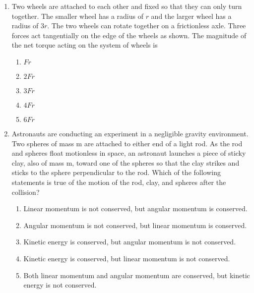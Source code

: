 \documentclass{../../oss-apphys}
\begin{document}
\begin{multicols}{2}
\begin{enumerate}[leftmargin=18pt]
  \item Two wheels are attached to each other and fixed so that they can only
    turn together. The smaller wheel has a radius of $r$ and the larger wheel
    has a radius of $3r$. The two wheels can rotate together on a frictionless
    axle. Three forces act tangentially on the edge of the wheels as shown.
    The magnitude of the net torque acting on the system of wheels is
    \begin{center}
    \end{center}
    \begin{enumerate}[noitemsep,topsep=0pt]
    \item$Fr$
    \item$2Fr$
    \item$3Fr$
    \item$4Fr$
    \item$6Fr$
    \end{enumerate}
    \columnbreak
    
  \item Astronauts are conducting an experiment in a negligible gravity
    environment. Two spheres of mass m are attached to either end of a
    light rod. As the rod and spheres float motionless in space, an astronaut
    launches a piece of sticky clay, also of mass m, toward one of the
    spheres so that the clay strikes and sticks to the sphere perpendicular to
    the rod. Which of the following statements is true of the motion of the
    rod, clay, and spheres after the collision?
    \begin{center}
    \end{center}
    \begin{enumerate}[topsep=5pt]
    \item Linear momentum is not conserved, but angular momentum is conserved.
    \item Angular momentum is not conserved, but linear momentum is conserved.
    \item Kinetic energy is conserved, but angular momentum is not conserved.
    \item Kinetic energy is conserved, but linear momentum is not conserved.
    \item Both linear momentum and angular momentum are conserved, but kinetic
      energy is not conserved.
    \end{enumerate}
    \columnbreak
    

\end{enumerate}
\end{multicols}
\end{document}
